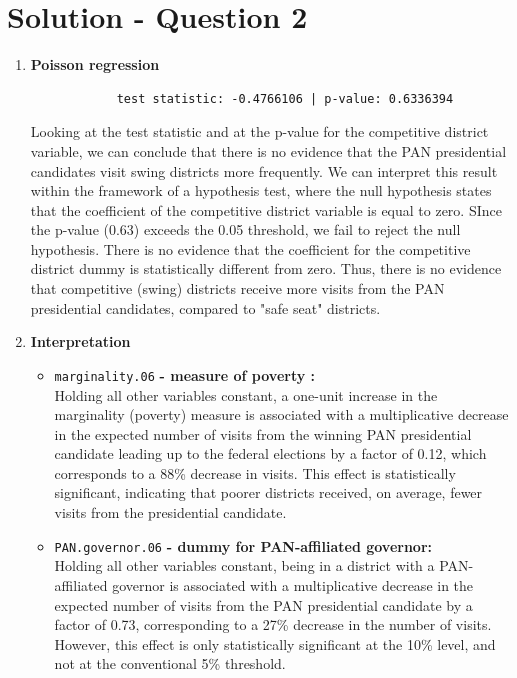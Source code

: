 \documentclass[12pt,letterpaper]{article}
\begin{document}
\section*{Solution - Question 2}
\vspace{0.25cm}
\begin{enumerate}
	\item [(a)] \textbf{Poisson regression}
		
		\begin{verbatim}
			test statistic: -0.4766106 | p-value: 0.6336394 
		\end{verbatim}
		Looking at the test statistic and at the p-value for the competitive district variable, we can conclude that there is no evidence that the PAN presidential candidates visit swing districts more frequently. We can interpret this result within the framework of a hypothesis test, where the null hypothesis states that the coefficient of the competitive district variable is equal to zero. SInce the p-value (0.63) exceeds the 0.05 threshold, we fail to reject the null hypothesis. There is no evidence that the coefficient for the competitive district dummy is statistically different from zero. Thus, there is no evidence that competitive (swing) districts receive more visits from the PAN presidential candidates, compared to "safe seat" districts. 
	\item [(b)] \textbf{Interpretation}
	\begin{itemize}
		\item \texttt{marginality.06} \textbf{- measure of poverty :} \\[.2cm] Holding all other variables constant, a one-unit increase in the marginality (poverty) measure is associated with a multiplicative decrease in the expected number of visits from the winning PAN presidential candidate leading up to the federal elections by a factor of 0.12, which corresponds to a 88\% decrease in visits. This effect is statistically significant, indicating that poorer districts received, on average, fewer visits from the presidential candidate. 
		\item \texttt{PAN.governor.06} \textbf{- dummy for PAN-affiliated governor: } \\[.2cm]Holding all other variables constant, being in a district with a PAN-affiliated governor is associated with a multiplicative decrease in the expected number of visits from the PAN presidential candidate by a factor of 0.73, corresponding to a 27\% decrease in the number of visits. However, this effect is only statistically significant at the 10\% level, and not at the conventional 5\% threshold. 

\end{itemize}
\end{enumerate}
\end{document}
